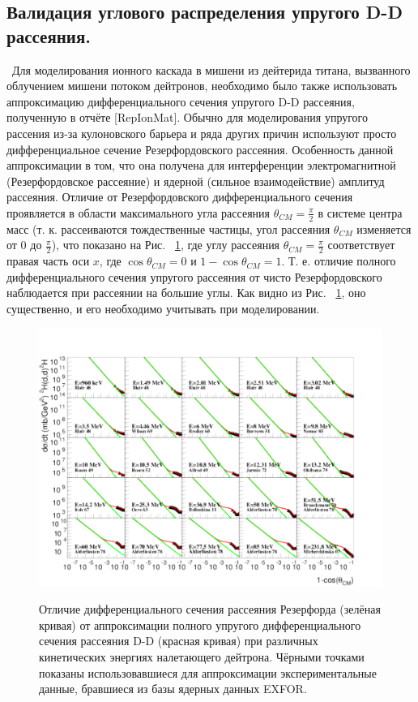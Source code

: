 \documentclass[a4paper,12pt]{article}
\begin{document}
\begin{large}
\section{Валидация углового распределения упругого D-D рассеяния.}
\label{ValElasticDD}
\
	Для моделирования ионного каскада в мишени из дейтерида титана, вызванного облучением мишени потоком дейтронов, необходимо было также использовать аппроксимацию дифференциального сечения упругого D-D рассеяния, полученную в отчёте [RepIonMat]. Обычно для моделирования упругого рассения из-за кулоновского барьера и ряда других причин используют просто дифференциальное сечение Резерфордовского рассеяния. Особенность данной аппроксимации в том, что она получена для интерференции электромагнитной (Резерфордовское рассеяние) и ядерной (сильное взаимодействие) амплитуд рассеяния. Отличие от Резерфордовского дифференциального сечения проявляется в области максимального угла рассеяния $\theta_{CM}=\frac{\pi}{2}$ в системе центра масс (т. к. рассеиваются тождественные частицы, угол рассеяния $\theta_{CM}$ изменяется от 0 до $\frac{\pi}{2}$), что показано на Рис. ~\ref{fig:DifferenceOfElasticDDFromRutherfordDifferentialCrossSection}, где углу рассеяния $\theta_{CM}=\frac{\pi}{2}$ соответствует правая часть оси $x$, где $\cos{\theta_{CM}}=0$ и $1-\cos{\theta_{CM}}=1$. Т. е. отличие полного дифференциального сечения упругого рассеяния от чисто Резерфордовского наблюдается при рассеянии на большие углы. Как видно из Рис. ~\ref{fig:DifferenceOfElasticDDFromRutherfordDifferentialCrossSection}, оно существенно, и его необходимо учитывать при моделировании.
	
\begin{figure}[ht]
  {
     \includegraphics[width=0.99\linewidth]{images/difference_of_elastic_dd_from_rutherford_differential_cross_section.pdf}
  }
  \caption{Отличие дифференциального сечения рассеяния Резерфорда (зелёная кривая) от аппроксимации полного упругого дифференциального сечения рассеяния D-D (красная кривая) при различных кинетических энергиях налетающего дейтрона. Чёрными точками показаны использовавшиеся для аппроксимации экспериментальные данные, бравшиеся из базы ядерных данных EXFOR.}
  \label{fig:DifferenceOfElasticDDFromRutherfordDifferentialCrossSection}
\end{figure}	
	

\end{large}
\end{document}
